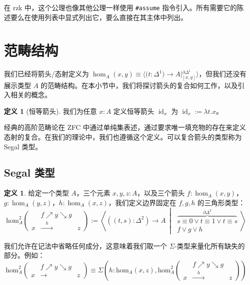 \documentclass{ctexrep}
\theoremstyle{plain}
\theoremstyle{definition}
\newtheorem{definition}[theorem]{定义}
\theoremstyle{remark}
\theoremstyle{definition}
\theoremstyle{definition}
\theoremstyle{definition}
\newcommand{\coloneqq}{\mathrel{:=}}
\newcommand{\id}{\operatorname{id}}
\begin{document}
在 rzk 中，这个公理也像其他公理一样使用 \verb|#assume| 指令引入。所有需要它的陈述要么在使用列表中显式列出它，要么直接在其主体中列出。

\section{范畴结构}

我们已经将箭头/态射定义为 $\hom_A(x,y) \equiv \Big\langle \big(t : \Delta^1\big) \to A \mathrel{\Big|} {}_{[x,y]}^{\partial\Delta^1} \Big\rangle$，但我们还没有展示类型 $A$ 的范畴结构。在本小节中，我们将探讨箭头的复合如何工作，以及引入相关的概念。

\begin{definition}[恒等箭头]
我们为任意 $x:A$ 定义恒等箭头 $\id_x$ 为 $\id_x \coloneqq \lambda t.x$。
\end{definition}

经典的高阶范畴论在 ZFC 中通过单纯集表述，通过要求唯一填充物的存在来定义态射的复合。在我们的理论中，我们也遵循这个定义。可以复合箭头的类型称为 Segal 类型。

\subsection{Segal 类型}

\begin{definition}
给定一个类型 $A$，三个元素 $x,y,z:A$，以及三个箭头 $f:\hom_A(x,y)$，$g:\hom_A(y,z)$，$h:\hom_A(x,z)$，我们定义边界固定在 $f,g,h$ 的三角形类型：
\[
\text{hom}_A^2 \left( 
\begin{matrix} 
& f \nearrow y \searrow g & \\ 
x & \xrightarrow{\quad h \quad} & z 
\end{matrix} 
\right) 
:= \left\langle ((t, s) : \Delta^2) \to A \ \middle| \ 
\begin{matrix} 
\overbrace{s \equiv 0 \lor t \equiv 1 \lor t \equiv s}^{\partial \Delta^2} \\ 
f \lor g \lor h 
\end{matrix} 
\right\rangle
\]
\end{definition}

我们允许在记法中省略任何成分，这意味着我们取一个 $\Sigma$-类型来量化所有缺失的部分。例如：
\[
\text{hom}_A^2 \left( 
\begin{matrix} 
& f \nearrow y \searrow g & \\ 
x & \rightarrow & z 
\end{matrix} 
\right) 
\equiv \Sigma \left( 
h : \text{hom}_A(x, z), \text{hom}_A^2 \left( 
\begin{matrix} 
& f \nearrow y \searrow g & \\ 
x & \xrightarrow{\quad h \quad} & z 
\end{matrix} 
\right) 
\right)
\]
\end{document}
